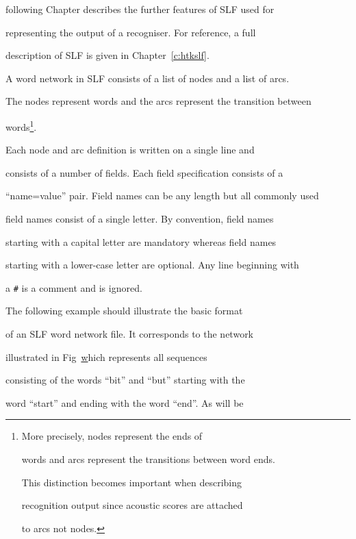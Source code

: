 following Chapter describes the further features of SLF used for


representing the output of a recogniser. For reference, a full


description of SLF is given in Chapter~\ref{c:htkslf}.







A word network in SLF consists of a list of nodes and a list of arcs.  


The nodes represent words and the arcs represent the transition between


words\footnote{More precisely, nodes represent the ends of


words and arcs represent the transitions between word ends.


This distinction becomes important when describing


recognition output since acoustic scores are attached


to arcs not nodes. }.  


Each node and arc definition is written on a single line and


consists of a number of fields. Each field specification consists of a


``name=value'' pair. Field names can be any length but all commonly used


field names consist of a single letter.  By convention, field names


starting  with a capital letter are mandatory  whereas field names


starting with a lower-case letter are optional.  Any line beginning with


a \texttt{\#} is a comment and is ignored.










The following example should illustrate the basic format 


of an SLF word network file.  It corresponds to the network


illustrated in Fig~\href{f:wdnet} which represents all sequences


consisting of the words ``bit'' and ``but'' starting with the


word ``start'' and ending with the word ``end''.  As will be


